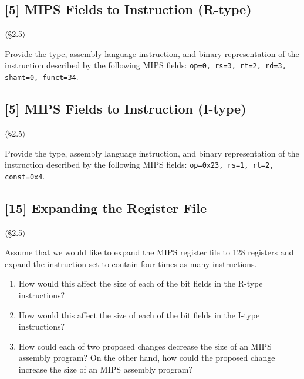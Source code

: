 \subsection{[5] MIPS Fields to Instruction (R-type)}
\hypertarget{prob-2.14}{}
\noindent$\langle$\S2.5$\rangle$\medskip

\noindent Provide the type, assembly language instruction, and binary
representation of the instruction described by the following MIPS fields:
\texttt{op=0, rs=3, rt=2, rd=3, shamt=0, funct=34}.

\problembreak

\subsection{[5] MIPS Fields to Instruction (I-type)}
\hypertarget{prob-2.15}{}
\noindent$\langle$\S2.5$\rangle$\medskip

\noindent Provide the type, assembly language instruction, and binary
representation of the instruction described by the following MIPS fields:
\texttt{op=0x23, rs=1, rt=2, const=0x4}.

\problembreak

\subsection{[15] Expanding the Register File}
\hypertarget{prob-2.16}{}
\noindent$\langle$\S2.5$\rangle$\medskip

\noindent Assume that we would like to expand the MIPS register file to 128
registers and expand the instruction set to contain four times as many
instructions.

\begin{enumerate}
  \item[2.16.1] [5] How would this affect the size of each of the bit fields in
        the R-type instructions?
  \item[2.16.2] [5] How would this affect the size of each of the bit fields in
        the I-type instructions?
  \item[2.16.3] [5] How could each of two proposed changes decrease the size of
        an MIPS assembly program? On the other hand, how could the proposed
        change increase the size of an MIPS assembly program?
\end{enumerate}

